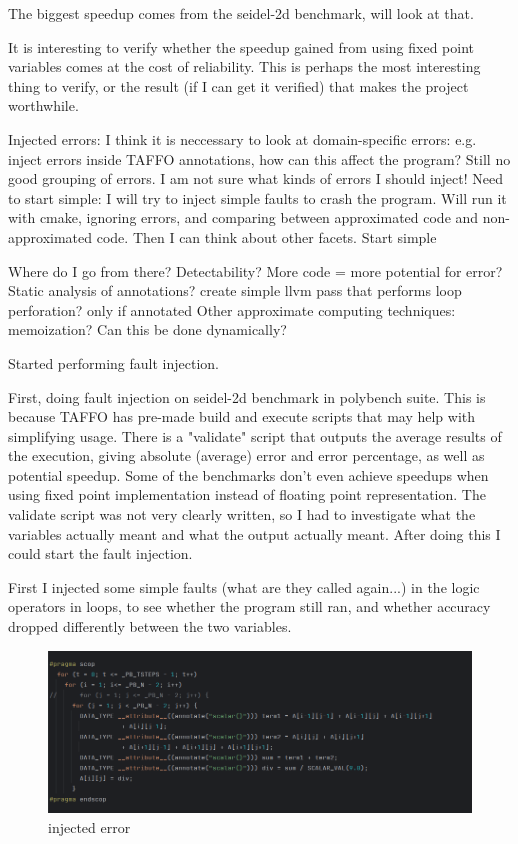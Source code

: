 The biggest speedup comes from the seidel-2d benchmark, will look at that.

It is interesting to verify whether the speedup gained from using fixed point variables comes at the cost of reliability. This is perhaps the most interesting thing to verify, or the result (if I can get it verified) that makes the project worthwhile.


Injected errors: I think it is neccessary to look at domain-specific errors: e.g. inject errors inside TAFFO annotations, how can this affect the program? 
Still no good grouping of errors. I am not sure what kinds of errors I should inject! Need to start simple:
I will try to inject simple faults to crash the program. Will run it with cmake, ignoring errors, and comparing between approximated code and non-approximated code. 
Then I can think about other facets. Start simple

Where do I go from there? Detectability? 
More code = more potential for error?
Static analysis of annotations?
create simple llvm pass that performs loop perforation? only if annotated  
    Other approximate computing techniques:
    memoization? Can this be done dynamically?




Started performing fault injection.

First, doing fault injection on seidel-2d benchmark in polybench suite. This is because TAFFO has pre-made build and execute scripts that may help with simplifying usage. 
There is a "validate" script that outputs the average results of the execution, giving absolute (average) error and error percentage, as well as potential speedup. Some of the benchmarks don't even achieve speedups when using fixed point implementation instead of floating point representation.
The validate script was not very clearly written, so I had to investigate what the variables actually meant and what the output actually meant. After doing this I could start the fault injection.

First I injected some simple faults (what are they called again...) in the logic operators in loops, to see whether the program still ran, and whether accuracy dropped differently between the two variables.
\begin{figure}
    \centering
    \includegraphics[width=0.5\linewidth]{Images/injected_basic_error.png}
    \caption{injected error}
    \label{fig:enter-label}
\end{figure}

